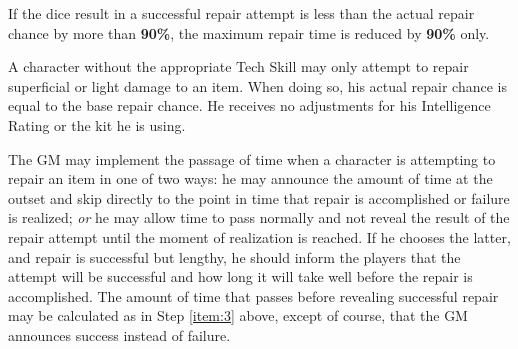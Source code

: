 If the dice result in a successful repair attempt is less than the
actual repair chance by more than \textbf{90\%}, the maximum repair time is
reduced by \textbf{90\%} only.

A character without the appropriate Tech Skill may only attempt to
repair superficial or light damage to an item.  When doing so, his
actual repair chance is equal to the base repair chance.  He receives
no adjustments for his Intelligence Rating or the kit he is using.

The GM may implement the passage of time when a character is
attempting to repair an item in one of two ways: he may announce the
amount of time at the outset and skip directly to the point in time
that repair is accomplished or failure is realized; \emph{or} he may allow
time to pass normally and not reveal the result of the repair attempt
until the moment of realization is reached.  If he chooses the latter,
and repair is successful but lengthy, he should inform the players
that the attempt will be successful and how long it will take well
before the repair is accomplished.  The amount of time that passes
before revealing successful repair may be calculated as in Step \ref{item:3}
above, except of course, that the GM announces success instead of
failure.

\begin{table}[htbp]
  \centering
\end{table}

